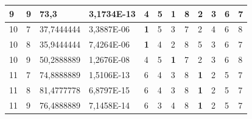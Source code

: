 \documentclass[conference]{IEEEtran}
\begin{document}
\begin{table}[]
\begin{tabular}{|llll|llllllll|}
		\multicolumn{1}{|l|}{9}   & \multicolumn{1}{l|}{9}         & \multicolumn{1}{l|}{73,3}          & 3,1734E-13 & \multicolumn{1}{l|}{4}          & \multicolumn{1}{l|}{5}          & \multicolumn{1}{l|}{\textbf{1}} & \multicolumn{1}{l|}{8}   & \multicolumn{1}{l|}{2}          & \multicolumn{1}{l|}{3}          & \multicolumn{1}{l|}{6}   & 7                      \\ \hline
		\multicolumn{1}{|l|}{10}  & \multicolumn{1}{l|}{7}         & \multicolumn{1}{l|}{37,7444444}    & 3,3887E-06 & \multicolumn{1}{l|}{\textbf{1}} & \multicolumn{1}{l|}{5}          & \multicolumn{1}{l|}{3}          & \multicolumn{1}{l|}{7}   & \multicolumn{1}{l|}{2}          & \multicolumn{1}{l|}{4}          & \multicolumn{1}{l|}{6}   & 8                      \\ \hline
		\multicolumn{1}{|l|}{10}  & \multicolumn{1}{l|}{8}         & \multicolumn{1}{l|}{35,9444444}    & 7,4264E-06 & \multicolumn{1}{l|}{\textbf{1}} & \multicolumn{1}{l|}{4}          & \multicolumn{1}{l|}{2}          & \multicolumn{1}{l|}{8}   & \multicolumn{1}{l|}{5}          & \multicolumn{1}{l|}{3}          & \multicolumn{1}{l|}{6}   & 7                      \\ \hline
		\multicolumn{1}{|l|}{10}  & \multicolumn{1}{l|}{9}         & \multicolumn{1}{l|}{50,2888889}    & 1,2676E-08 & \multicolumn{1}{l|}{4}          & \multicolumn{1}{l|}{5}          & \multicolumn{1}{l|}{\textbf{1}} & \multicolumn{1}{l|}{7}   & \multicolumn{1}{l|}{2}          & \multicolumn{1}{l|}{3}          & \multicolumn{1}{l|}{6}   & 8                      \\ \hline
		\multicolumn{1}{|l|}{11}  & \multicolumn{1}{l|}{7}         & \multicolumn{1}{l|}{74,8888889}    & 1,5106E-13 & \multicolumn{1}{l|}{6}          & \multicolumn{1}{l|}{4}          & \multicolumn{1}{l|}{3}          & \multicolumn{1}{l|}{8}   & \multicolumn{1}{l|}{\textbf{1}} & \multicolumn{1}{l|}{2}          & \multicolumn{1}{l|}{5}   & 7                      \\ \hline
		\multicolumn{1}{|l|}{11}  & \multicolumn{1}{l|}{8}         & \multicolumn{1}{l|}{81,4777778}    & 6,8797E-15 & \multicolumn{1}{l|}{6}          & \multicolumn{1}{l|}{4}          & \multicolumn{1}{l|}{3}          & \multicolumn{1}{l|}{8}   & \multicolumn{1}{l|}{\textbf{1}} & \multicolumn{1}{l|}{2}          & \multicolumn{1}{l|}{5}   & 7                      \\ \hline
		\multicolumn{1}{|l|}{11}  & \multicolumn{1}{l|}{9}         & \multicolumn{1}{l|}{76,4888889}    & 7,1458E-14 & \multicolumn{1}{l|}{6}          & \multicolumn{1}{l|}{3}          & \multicolumn{1}{l|}{4}          & \multicolumn{1}{l|}{8}   & \multicolumn{1}{l|}{\textbf{1}} & \multicolumn{1}{l|}{2}          & \multicolumn{1}{l|}{5}   & 7                      \\ \hline

\end{tabular}
\end{table}
\end{document}
